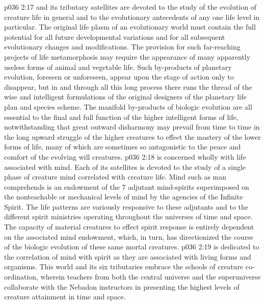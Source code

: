 \vs p036 2:17 \pc {} and its tributary satellites are devoted to the study of the evolution of creature life in general and to the evolutionary antecedents of any one life level in particular. The original life plasm of an evolutionary world must contain the full potential for all future developmental variations and for all subsequent evolutionary changes and modifications. The provision for such far\hyp{}reaching projects of life metamorphosis may require the appearance of many apparently useless forms of animal and vegetable life. Such by\hyp{}products of planetary evolution, foreseen or unforeseen, appear upon the stage of action only to disappear, but in and through all this long process there runs the thread of the wise and intelligent formulations of the original designers of the planetary life plan and species scheme. The manifold by\hyp{}products of biologic evolution are all essential to the final and full function of the higher intelligent forms of life, notwithstanding that great outward disharmony may prevail from time to time in the long upward struggle of the higher creatures to effect the mastery of the lower forms of life, many of which are sometimes so antagonistic to the peace and comfort of the evolving will creatures.
\vs p036 2:18 \pc {} is concerned wholly with life associated with mind. Each of its satellites is devoted to the study of a single phase of creature mind correlated with creature life. Mind such as man comprehends is an endowment of the 7 adjutant mind\hyp{}spirits superimposed on the nonteachable or mechanical levels of mind by the agencies of the Infinite Spirit. The life patterns are variously responsive to these adjutants and to the different spirit ministries operating throughout the universes of time and space. The capacity of material creatures to effect spirit response is entirely dependent on the associated mind endowment, which, in turn, has directionized the course of the biologic evolution of these same mortal creatures.
\vs p036 2:19 \pc {} is dedicated to the correlation of mind with spirit as they are associated with living forms and organisms. This world and its six tributaries embrace the schools of creature co\hyp{}ordination, wherein teachers from both the central universe and the superuniverse collaborate with the Nebadon instructors in presenting the highest levels of creature attainment in time and space.

